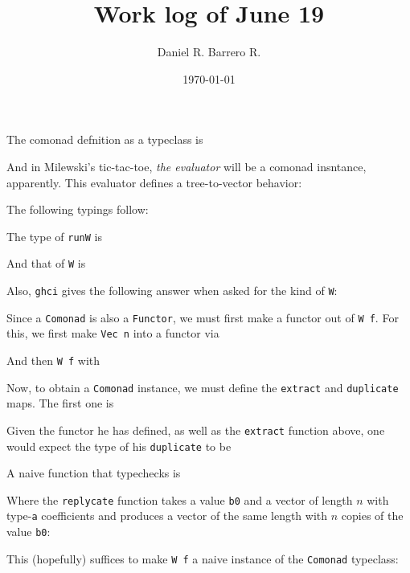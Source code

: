 \documentclass{amsart}
\title{Work log of June 19}
\author{Daniel R. Barrero R.}
\date{\today}
\begin{document}
\maketitle

\section{}

The comonad defnition as a typeclass is



And in Milewski's tic-tac-toe, \emph{the evaluator} will be a comonad insntance,
apparently. This evaluator defines a tree-to-vector behavior:



The following typings follow:

\bigskip

The type of \texttt{runW} is



And that of \texttt{W} is



Also, \texttt{ghci} gives the following answer when asked for the kind of
\texttt{W}:



Since a \texttt{Comonad} is also a \texttt{Functor}, we must first make a
functor out of \texttt{W f}. For this, we first make \texttt{Vec n} into a
functor via



And then \texttt{W f} with



Now, to obtain a \texttt{Comonad} instance, we must define the \texttt{extract}
and \texttt{duplicate} maps. The first one is



Given the functor he has defined, as well as the \texttt{extract} function
above, one would expect the type of his \texttt{duplicate} to be



A naive function that typechecks is



Where the \texttt{replycate} function takes a value \texttt{b0} and a
vector of length $n$ with type-\texttt{a} coefficients and produces a vector
of the same length with $n$ copies of the value \texttt{b0}:



This (hopefully) suffices to make \texttt{W f} a naive instance of the
\texttt{Comonad} typeclass:
\end{document}
